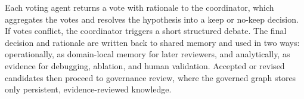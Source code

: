 \documentclass{article}
\newcommand{\system}{\textsc{MAGG}}
\begin{document}
Each voting agent returns a vote with rationale to the coordinator, which aggregates the votes and resolves the hypothesis into a keep or no-keep decision. If votes conflict, the coordinator triggers a short structured debate. The final decision and rationale are written back to shared memory and used in two ways: operationally, as domain-local memory for later reviewers, and analytically, as evidence for debugging, ablation, and human validation. Accepted or revised candidates then proceed to governance review, where the governed graph stores only persistent, evidence-reviewed knowledge.


\end{document}
